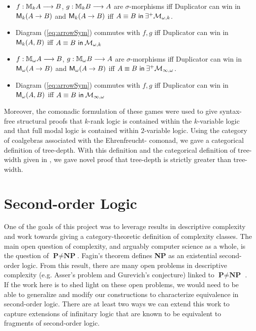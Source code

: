 \begin{itemize}
\item $f:{\mathbb{M}_{k}A} \longrightarrow B$, $g:{\mathbb{M}_{k}B} \longrightarrow A$ are $\sigma$-morphisms iff Duplicator can win in ${\mathsf{M}_{k}(A \rightarrow B)}$ and ${\mathsf{M}_{k}(A \rightarrow B)}$ iff ${A \equiv B \ \mathsf{in}\: \exists^{+}\mathcal{M}_{\omega,k}}$.
\item Diagram (\ref{eq:arrowSym}) commutes with $f,g$ iff Duplicator can win in ${\mathsf{M}_{k}(A,B)}$ iff ${A \equiv B \ \mathsf{in}\: \mathcal{M}_{\omega,k}}$
\item $f:{\mathbb{M}_{\omega}A} \longrightarrow B$, $g:{\mathbb{M}_{\omega}B} \longrightarrow A$ are $\sigma$-morphisms iff Duplicator can win in ${\mathsf{M}_{\omega}(A \rightarrow B)}$ and ${\mathsf{M}_{\omega}(A \rightarrow B)}$ iff ${A \equiv B \ \mathsf{in}\: \exists^{+}\mathcal{M}_{\infty,\omega}}$.
\item Diagram (\ref{eq:arrowSym}) commutes with $f,g$ iff Duplicator can win in ${\mathsf{M}_{\omega}(A,B)}$ iff ${A \equiv B \ \mathsf{in}\: \mathcal{M}_{\infty,\omega}}$
\end{itemize}
Moreover, the comonadic formulation of these games were used to give syntax-free structural proofs that $k$-rank logic is contained within the $k$-variable logic and that full modal logic is contained within $2$-variable logic. Using the category of coalgebras associated with the Ehrenfreucht-{\Fraisse} comonad, we gave a categorical definition of tree-depth. With this definition and the categorical definition of tree-width given in \cite{Abramsky2017}, we gave novel proof that tree-depth is strictly greater than tree-width.  
\section{Second-order Logic}
One of the goals of this project was to leverage results in descriptive complexity and work towards giving a category-theoretic definition of complexity classes. The main open question of complexity, and arguably computer science as a whole, is the question of $\textbf{P} \not= \textbf{NP}$. Fagin's theorem defines \textbf{NP} as an existential second-order logic. From this result, there are many open problems in descriptive complexity (e.g. Asser's problem and Gurevich's conjecture) linked to $\textbf{P} \not= \textbf{NP}$ \cite{Libkin2004}. If the work here is to shed light on these open problems, we would need to be able to generalize and modify our constructions to characterize equivalence in second-order logic. There are at least two ways we can extend this work to capture extensions of infinitary logic that are known to be equivalent to fragments of second-order logic. 
